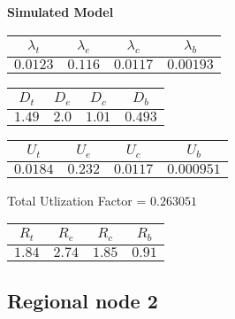 \documentclass{article}
\begin{document}
\begin{minipage}{0.5\textwidth}
\centering	\textbf{Simulated Model}
\begin{table}[H]
\centering
\begin{tabular}{@{}cccc@{}}
\toprule
$\lambda_t$ & $\lambda_e$ & $\lambda_c$ & $\lambda_b$\\
\midrule
$0.0123$ & $0.116$ & $0.0117$ & $0.00193$\\
\bottomrule
\end{tabular}
\end{table}
\begin{table}[H]
\centering
\begin{tabular}{@{}cccc@{}}
\toprule
$D_t$ & $D_e$ & $D_c$ & $D_b$\\
\midrule
$1.49$ & $2.0$ & $1.01$ & $0.493$\\
\bottomrule
\end{tabular}
\end{table}\begin{table}[H]
\centering
\begin{tabular}{@{}cccc@{}}
\toprule
$U_t$ & $U_e$ & $U_c$ & $U_b$\\
\midrule
$0.0184$ & $0.232$ & $0.0117$ & $0.000951$\\
\bottomrule
\end{tabular}
\end{table}
\centering Total Utlization Factor = $0.263051$
\begin{table}[H]
\centering
\begin{tabular}{@{}cccc@{}}
\toprule
$R_t$ & $R_e$ & $R_c$ & $R_b$\\
\midrule
$1.84$ & $2.74$ & $1.85$ & $0.91$\\
\bottomrule
\end{tabular}
\end{table}
\end{minipage}\subsection{Regional node 2}
\end{document}

